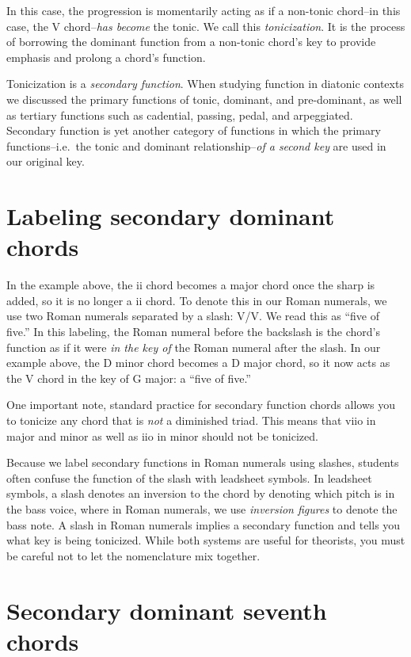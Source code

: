 \documentclass{book}
\begin{document}
In this case, the progression is momentarily acting as if a non-tonic
chord--in this case, the V chord--\emph{has become} the tonic. We call this
\emph{tonicization}. It is the process of borrowing the dominant function from
a non-tonic chord's key to provide emphasis and prolong a chord's function.

Tonicization is a \emph{secondary function}. When studying function in
diatonic contexts we discussed the primary functions of tonic, dominant, and
pre-dominant, as well as tertiary functions such as cadential, passing, pedal,
and arpeggiated. Secondary function is yet another category of functions in
which the primary functions--i.e.~the tonic and dominant
relationship--\emph{of a second key} are used in our original key.

\hypertarget{labeling-secondary-dominant-chords}{%
\section{Labeling secondary dominant
chords}\label{labeling-secondary-dominant-chords}}

In the example above, the ii chord becomes a major chord once the sharp is
added, so it is no longer a ii chord. To denote this in our Roman numerals, we
use two Roman numerals separated by a slash: V/V. We read this as ``five of
five.'' In this labeling, the Roman numeral before the backslash is the
chord's function as if it were \emph{in the key of} the Roman numeral after
the slash. In our example above, the D minor chord becomes a D major chord, so
it now acts as the V chord in the key of G major: a ``five of five.''

One important note, standard practice for secondary function chords allows you
to tonicize any chord that is \emph{not} a diminished triad. This means that
viio in major and minor as well as iio in minor should not be tonicized.

Because we label secondary functions in Roman numerals using slashes, students
often confuse the function of the slash with leadsheet symbols. In leadsheet
symbols, a slash denotes an inversion to the chord by denoting which pitch is
in the bass voice, where in Roman numerals, we use \emph{inversion figures} to
denote the bass note. A slash in Roman numerals implies a secondary function
and tells you what key is being tonicized. While both systems are useful for
theorists, you must be careful not to let the nomenclature mix together.

\hypertarget{secondary-dominant-seventh-chords}{%
\section{Secondary dominant seventh
chords}\label{secondary-dominant-seventh-chords}}
\end{document}
